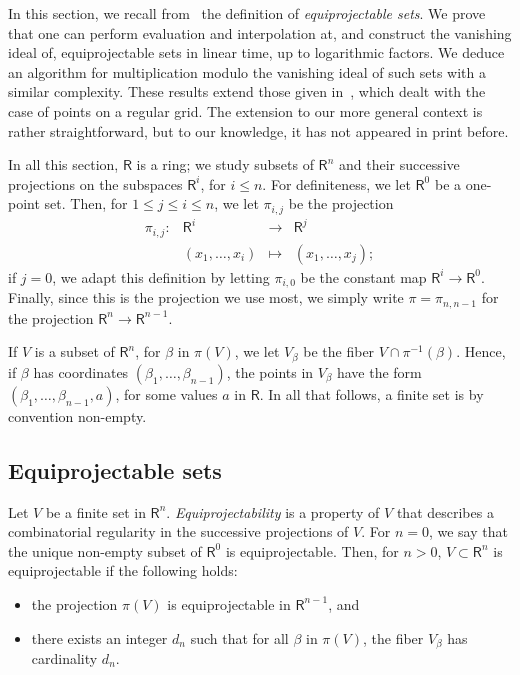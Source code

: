 \documentclass[amsthm]{elsart}
\def\rng {\ensuremath{\mathsf{R}}}
\theoremstyle{plain}
\begin{document}
In this section, we recall from~\cite{AuVa00} the definition of {\em
  equiprojectable sets}.  We prove that one can perform evaluation and
interpolation at, and construct the vanishing ideal of,
equiprojectable sets in linear time, up to logarithmic factors. We
deduce an algorithm for multiplication modulo the vanishing ideal of
such sets with a similar complexity. These results extend those given
in~\cite{Pan94,LiMoSc07}, which dealt with the case of points on a
regular grid. The extension to our more general context is rather
straightforward, but to our knowledge, it has not appeared in print
before.

In all this section, $\rng$ is a ring; we study subsets of $\rng^n$
and their successive projections on the subspaces $\rng^i$, for $i\le
n$. For definiteness, we let $\rng^0$ be a one-point set.  Then, for $1
\le j \le i \le n$, we let $\pi_{i,j}$ be the projection
$$\begin{array}{cccc}
\pi_{i,j}:& \rng^i & \to & \rng^{j} \\
& (x_1,\dots,x_i) & \mapsto & (x_1,\dots,x_j);
\end{array}$$
if $j=0$, we adapt this definition by letting $\pi_{i,0}$ be the
constant map $\rng^i \to \rng^0$. Finally, since this is the
projection we use most, we simply write $\pi=\pi_{n,n-1}$ for the
projection $\rng^n \to \rng^{n-1}$.

If $V$ is a subset of $\rng^n$, for $\beta$ in $\pi(V)$, we let
$V_\beta$ be the fiber $V \cap \pi^{-1}(\beta)$. Hence, if $\beta$ has
coordinates $(\beta_1,\dots,\beta_{n-1})$, the points in $V_\beta$
have the form $(\beta_1,\dots,\beta_{n-1},a)$, for some values $a$ in
$\rng$.  In all that follows, a finite set is by convention non-empty.



\subsection{Equiprojectable sets}

Let $V$ be a finite set in $\rng^n$. {\em Equiprojectability} is a
property of $V$ that describes a combinatorial regularity in the
successive projections of $V$. For $n=0$, we say that the unique
non-empty subset of $\rng^0$ is equiprojectable. Then, for $n>0$,
$V\subset\rng^n$ is equiprojectable if the following holds:

\smallskip

\begin{itemize}
\item the projection $\pi(V)$ is equiprojectable in $\rng^{n-1}$, and

\smallskip

\item there exists an integer $d_n$ such that for all $\beta$ in
  $\pi(V)$, the fiber $V_\beta$ has cardinality $d_n$.
\end{itemize}
\end{document}
